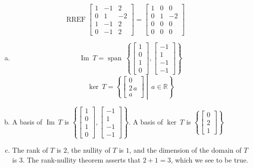 \begin{exerciseAnswer} 


\[\operatorname{RREF} \left[\begin{array}{ccc}
1 & -1 & 2 \\
0 & 1 & -2 \\
1 & -1 & 2 \\
0 & -1 & 2
\end{array}\right] = \left[\begin{array}{ccc}
1 & 0 & 0 \\
0 & 1 & -2 \\
0 & 0 & 0 \\
0 & 0 & 0
\end{array}\right] \]


\begin{enumerate}[(a)]
\item \[\operatorname{Im}\ T = \operatorname{span}\  \left\{ \left[\begin{array}{c}
1 \\
0 \\
1 \\
0
\end{array}\right] , \left[\begin{array}{c}
-1 \\
1 \\
-1 \\
-1
\end{array}\right] \right\} \]\[\operatorname{ker}\ T =  \left\{ \left[\begin{array}{c}
0 \\
2 \, a \\
a
\end{array}\right] \middle|\,a\in\mathbb{R}\right\} \]
\item  A basis of \(\operatorname{Im}\ T\) is \( \left\{ \left[\begin{array}{c}
1 \\
0 \\
1 \\
0
\end{array}\right] , \left[\begin{array}{c}
-1 \\
1 \\
-1 \\
-1
\end{array}\right] \right\} \). A basis of \(\operatorname{ker}\ T\) is \( \left\{ \left[\begin{array}{c}
0 \\
2 \\
1
\end{array}\right] \right\} \)
\item  The rank of \(T\) is \( 2 \), the nullity of \(T\) is \( 1 \), and the dimension of the domain of \(T\) is \( 3 \). The rank-nullity theorem asserts that \( 2 + 1 = 3 \), which we see to be true. 
\end{enumerate}
    
\end{exerciseAnswer}
    
